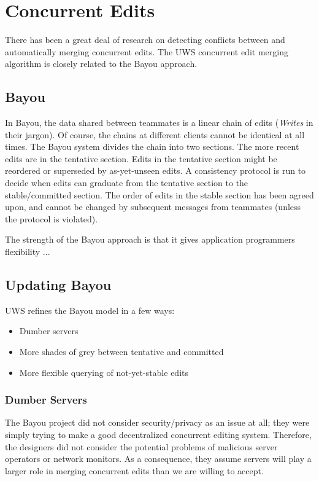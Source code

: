 \documentclass{article}
\begin{document}
\section{Concurrent Edits}

There has been a great deal of research on detecting conflicts between and automatically merging concurrent edits.
The UWS concurrent edit merging algorithm is closely related to the Bayou approach.

\subsection{Bayou}

In Bayou, the data shared between teammates is a linear chain of edits (\emph{Writes} in their jargon).
Of course, the chains at different clients cannot be identical at all times.
The Bayou system divides the chain into two sections.
The more recent edits are in the tentative section.
Edits in the tentative section might be reordered or superseded by as-yet-unseen edits.
A consistency protocol is run to decide when edits can graduate from the tentative section to the stable/committed section.
The order of edits in the stable section has been agreed upon, and cannot be changed by subsequent messages from teammates (unless the protocol is violated).

The strength of the Bayou approach is that it gives application programmers flexibility ...

\subsection{Updating Bayou}

UWS refines the Bayou model in a few ways:

\begin{itemize}
\item Dumber servers
\item More shades of grey between tentative and committed
\item More flexible querying of not-yet-stable edits
\end{itemize}

\subsubsection{Dumber Servers}

The Bayou project did not consider security/privacy as an issue at all; they were simply trying to make a good decentralized concurrent editing system.
Therefore, the designers did not consider the potential problems of malicious server operators or network monitors.
As a consequence, they assume servers will play a larger role in merging concurrent edits than we are willing to accept.
\end{document}
